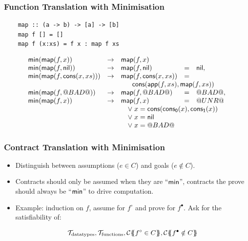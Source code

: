 \documentclass[serif,professionalfont]{beamer}
\begin{document}
\begin{frame}[fragile]
  \frametitle{Function Translation with Minimisation}

  \begin{verbatim}
    map :: (a -> b) -> [a] -> [b]
    map f [] = []
    map f (x:xs) = f x : map f xs
  \end{verbatim}

  \newcommand\mmap[2]{
    \Min(\map{#1}{#2}) & \to & \map{#1}{#2}
  }

  \[\begin{array}{lllll}
  \Min(\map{f}{x}) & \to & \map{f}{x} & & \\
  \mmap{f}{\nil}         & = & \nil, \\
  \mmap{f}{\cons{x}{xs}} & = & \\
  & & \multicolumn{3}{c}{\cons{\app{f}{xs}}{\map{f}{xs}}}  \\
  \mmap{f}{\bad}         & = & \bad, \\
  \mmap{f}{x}            & = & \unr \\
  & & \multicolumn{3}{l}{\quad \lor \; x = \cons{\conspi{x}}{\conspii{x}}} \\
  & & \multicolumn{3}{l}{\quad \lor \; x = \nil} \\
  & & \multicolumn{3}{l}{\quad \lor \; x = \bad} \\
  \end{array}\]
\end{frame}

\begin{frame}[fragile]
  \frametitle{Contract Translation with Minimisation}

  \begin{itemize}
    \item Distinguish between assumptions ($e \in C$) and goals ($e
      \notin C$).

    \item Contracts should only be assumed when they are ``$\mathsf{min}$'',
      contracts the prove should always be ``$\mathsf{min}$'' to drive
      computation.

    \item Example: induction on $f$, assume for $f^\circ$ and prove
      for $f^\bullet$. Ask for the satisfiability of:

      $$
        \mathcal{T}_{\text{datatypes}}, \mathcal{T}_{\text{functions}} ,
        \trc{f^\circ \in C},
        \trc{f^\bullet \notin C}
      $$
  \end{itemize}
\end{frame}
\end{document}

